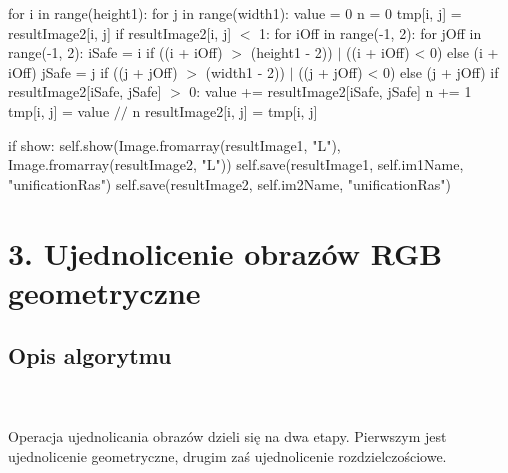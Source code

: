 \documentclass[final,a4paper,openany,12pt]{mwbk}
\begin{document}
for i in range(height1): \newline
\indent for j in range(width1): \newline
\indent value = 0 \newline
\indent n = 0 \newline
\indent tmp[i, j] = resultImage2[i, j] \newline
\indent if resultImage2[i, j] $<$ 1: \newline
\indent for iOff in range(-1, 2): \newline
\indent for jOff in range(-1, 2): \newline
\indent iSafe = i if ((i + iOff) $>$ (height1 - 2)) $\mid$ ((i + iOff) < 0) else (i + iOff) \newline
\indent jSafe = j if ((j + jOff) $>$ (width1 - 2)) $\mid$ ((j + jOff) < 0) else (j + jOff) \newline
\indent if resultImage2[iSafe, jSafe] $>$ 0: \newline
\indent value += resultImage2[iSafe, jSafe] \newline
\indent n += 1 \newline
tmp[i, j] = value $//$ n \newline
resultImage2[i, j] = tmp[i, j] \newline

\noindent if show: \newline
self.show(Image.fromarray(resultImage1, "L"), Image.fromarray(resultImage2, "L")) \newline
self.save(resultImage1, self.im1Name, "unificationRas") \newline
self.save(resultImage2, self.im2Name, "unificationRas") \newline
\newpage







\section*{3. Ujednolicenie obrazów RGB geometryczne}
\subsection*{Opis algorytmu}
\hfill
\\\\
\indent 
Operacja ujednolicania obrazów dzieli się na dwa etapy. Pierwszym jest ujednolicenie geometryczne, drugim zaś ujednolicenie rozdzielczościowe.
\end{document}
